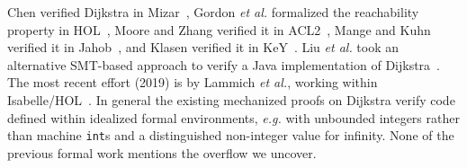 

Chen verified Dijkstra in Mizar~\cite{chen2003dijkstra}, Gordon \emph{et al.} formalized the reachability property in HOL~\cite{gordon2003executing}, Moore and Zhang verified it in ACL2~\cite{Moore2005}, Mange and Kuhn verified it in Jahob~\cite{mange2007verifying}, and Klasen verified it in KeY~\cite{klasen2010verifying}.  Liu \emph{et al.} took an alternative SMT-based approach to verify a Java implementation of Dijkstra~\cite{6200101}.  The most recent effort (2019) is by Lammich \emph{et al.}, working within Isabelle/HOL~\cite{DBLP:journals/afp/LammichN19}.  
In general the existing mechanized proofs on Dijkstra verify code defined within idealized formal environments, \emph{e.g.} with unbounded integers rather than machine \texttt{int}s and a distinguished non-integer value for infinity.  None of the previous formal work mentions the overflow we uncover.

